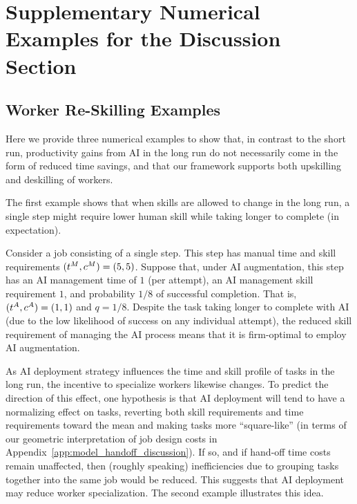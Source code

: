 \section{Supplementary Numerical Examples for the Discussion Section}
\label{app:discussion_examples}

\renewcommand{\theexample}{E.\arabic{example}}
\setcounter{example}{0}

\subsection{Worker Re-Skilling Examples}
\label{app:discussion_examples_reskilling}

Here we provide three numerical examples to show that, in contrast to the short run, productivity gains from AI in the long run do not necessarily come in the form of reduced time savings, and that our framework supports both upskilling and deskilling of workers.

The first example shows that when skills are allowed to change in the long run, a single step might require lower human skill while taking longer to complete (in expectation).
\begin{example}
    Consider a job consisting of a single step.  
    This step has manual time and skill requirements $(t^{M}_{},c^{M}_{}) = (5,5)$.  
    Suppose that, under AI augmentation, this step has an AI management time of $1$ (per attempt), an AI management skill requirement $1$, and probability $1/8$ of successful completion. 
    That is, $(t^{A}_{},c^{A}_{}) = (1,1)$ and $q=1/8$.
    Despite the task taking longer to complete with AI (due to the low likelihood of success on any individual attempt), the reduced skill requirement of managing the AI process means that it is firm-optimal to employ AI augmentation.
\end{example}

As AI deployment strategy influences the time and skill profile of tasks in the long run, the incentive to specialize workers likewise changes.
To predict the direction of this effect, one hypothesis is that AI deployment will tend to have a normalizing effect on tasks, reverting both skill requirements and time requirements toward the mean and making tasks more ``square-like'' (in terms of our geometric interpretation of job design costs in Appendix~\ref{app:model_handoff_discussion}).  
If so, and if hand-off time costs remain unaffected, then (roughly speaking) inefficiencies due to grouping tasks together into the same job would be reduced.  
This suggests that AI deployment may reduce worker specialization.
The second example illustrates this idea.


